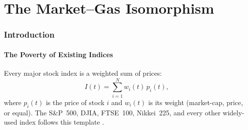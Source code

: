 \documentclass[twocolumn,10pt]{article}
\theoremstyle{remark}
\newcommand{\Sk}{S_k}
\newcommand{\St}{S_t}
\newcommand{\Se}{S_e}
\begin{document}
\begin{abstract}
The index is \emph{gauge-invariant}: all observables depend only on frequency ratios (gear ratios $R_{i \to j} = \omega_i/\omega_j$), never on absolute frequencies, rendering the DTI immune to inflation, stock splits, and currency effects.  Per-stock S-entropy coordinates $\mathbf{s}_i = (\Sk^{(i)}, \St^{(i)}, \Se^{(i)}) \in [0,1]^3$ provide time-invariant categorical addresses that encode each stock's geometric identity within the market's state space.  We show that every existing index---S\&P~500, DJIA, VIX---is a low-dimensional projection of the full thermodynamic state, discarding most of the information content.

All results are derived from a single axiom (bounded phase space) with zero adjustable parameters.  Testable predictions include the Maxwell--Boltzmann distribution for inter-transaction times ($\chi^2$ test), Clausius--Clapeyron slopes at regime boundaries, Carnot efficiency bounds on momentum strategies, and the fluctuation--dissipation ratio between implied and realised volatility.

\textbf{Keywords:} thermodynamic stock index, market-gas isomorphism, partition function, phase transitions, Carnot bound, fluctuation--dissipation theorem, gauge invariance, S-entropy coordinates, categorical address, van der Waals market, Central Molecule Impossibility, distributed network thermodynamics
\end{abstract}


\part{The Market--Gas Isomorphism}

\section{Introduction}
\label{sec:intro}

\subsection{The Poverty of Existing Indices}

Every major stock index is a weighted sum of prices:
\begin{equation}
    I(t) = \sum_{i=1}^{N} w_i(t) \, p_i(t),
    \label{eq:traditional_index}
\end{equation}
where $p_i(t)$ is the price of stock $i$ and $w_i(t)$ is its weight (market-cap, price, or equal).  The S\&P~500, DJIA, FTSE~100, Nikkei~225, and every other widely-used index follows this template \cite{mantegna2000}.
\end{document}
